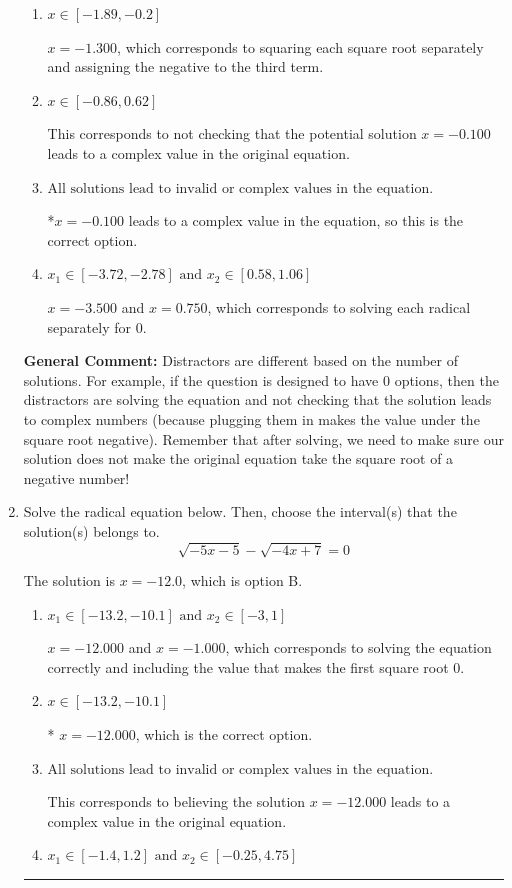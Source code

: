 \documentclass{extbook}[14pt]
\newcommand{\litem}[1]{\item #1

\rule{\textwidth}{0.4pt}}
\begin{document}
\begin{enumerate}
{\begin{enumerate}[label=\Alph*.]
$x = -3.500$ and $x = -0.100$, which corresponds to solving the equation correctly and including the value that makes the first square root 0.
\item \( x \in [-1.89,-0.2] \)

$x = -1.300$, which corresponds to squaring each square root separately and assigning the negative to the third term.
\item \( x \in [-0.86,0.62] \)

This corresponds to not checking that the potential solution $x = -0.100$ leads to a complex value in the original equation.
\item \( \text{All solutions lead to invalid or complex values in the equation.} \)

*$x = -0.100$ leads to a complex value in the equation, so this is the correct option.
\item \( x_1 \in [-3.72, -2.78] \text{ and } x_2 \in [0.58,1.06] \)

$x = -3.500$ and $x = 0.750$, which corresponds to solving each radical separately for 0.
\end{enumerate}

\textbf{General Comment:} Distractors are different based on the number of solutions. For example, if the question is designed to have 0 options, then the distractors are solving the equation and not checking that the solution leads to complex numbers (because plugging them in makes the value under the square root negative). Remember that after solving, we need to make sure our solution does not make the original equation take the square root of a negative number!
}
\litem{
Solve the radical equation below. Then, choose the interval(s) that the solution(s) belongs to.
\[ \sqrt{-5 x - 5} - \sqrt{-4 x + 7} = 0 \]

The solution is \( x = -12.0 \), which is option B.\begin{enumerate}[label=\Alph*.]
\item \( x_1 \in [-13.2, -10.1] \text{ and } x_2 \in [-3,1] \)

$x = -12.000$ and $x = -1.000$, which corresponds to solving the equation correctly and including the value that makes the first square root 0.
\item \( x \in [-13.2,-10.1] \)

* $x = -12.000$, which is the correct option.
\item \( \text{All solutions lead to invalid or complex values in the equation.} \)

This corresponds to believing the solution $x = -12.000$ leads to a complex value in the original equation.
\item \( x_1 \in [-1.4, 1.2] \text{ and } x_2 \in [-0.25,4.75] \)


\end{enumerate}}
\end{enumerate}
\end{document}
